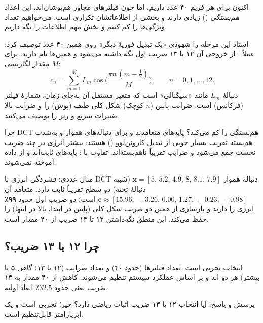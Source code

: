 اکنون برای هر فریم ۴۰ عدد داریم، اما چون فیلترهای مجاور هم‌پوشان‌اند، این اعداد \emph{هم‌بستگی} () زیادی دارند و بخشی از اطلاعاتشان تکراری است. می‌خواهیم تعداد ویژگی‌ها را کم کنیم و بخش مهم اطلاعات را نگه داریم.

استاد این مرحله را شهودی «یک تبدیل فوریهٔ دیگر» روی همین ۴۰ عدد توصیف کرد: عملاً . از خروجی آن ۱۲ یا ۱۳ ضریب اول نگه داشته می‌شود و همین‌ها  نام دارند. برای $M$ مقدار لگاریتمی:
\[
c_n=\sum_{m=1}^{M} L_m\cos\!\Big(\frac{\pi n\,(m-\tfrac12)}{M}\Big),\qquad n=0,1,\ldots,12 .
\]
دنبالهٔ $L_m$ مانند «سیگنالی» است که متغیر مستقل آن به‌جای زمان، شمارهٔ فیلتر (فرکانس) است. ضرایب پایین ($n$ کوچک) شکل کلی طیف (پوش) را و ضرایب بالا تغییرات سریع و ریز را توصیف می‌کنند.

\begin{correctionbox}{چرا DCT هم‌بستگی را کم می‌کند؟}
پایه‌های  متعامدند و برای دنباله‌های هموار و به‌شدت هم‌بسته تقریب بسیار خوبی از تبدیل کارونن‌لوو () هستند: بیشتر انرژی در چند ضریب نخست جمع می‌شود و ضرایب تقریباً ناهم‌بسته‌اند. تفاوت با : پایه‌های  ثابت‌اند و از داده آموخته نمی‌شوند.
\end{correctionbox}

\begin{addedbox}{مثال عددی: فشردگی انرژی با DCT}
دنبالهٔ هموار $\mathbf{x}=[5,\,5.2,\,4.9,\,8,\,8.1,\,7.9]$ (شبیه دنبالهٔ تخته) دو سطح تقریباً ثابت دارد.  متعامد آن $\mathbf{c}\approx[15.96,\,-3.26,\,0.00,\,1.27,\,-0.23,\,-0.98]$ است؛ دو ضریب اول حدود \textbf{۹۹٪} انرژی را دارند و بازسازی از همین دو ضریب شکل کلی (پایین در ابتدا، بالا در انتها) را حفظ می‌کند. این منطق نگه‌داشتن ۱۲ تا ۱۳ ضریب از ۴۰ مقدار است.
\end{addedbox}

\subsection{چرا ۱۲ یا ۱۳ ضریب؟}
انتخاب تجربی است. تعداد فیلترها (حدود ۴۰) و تعداد ضرایب (۱۲ یا ۱۳؛ گاهی ۵ یا بیشتر) هر دو اند و بر اساس عملکرد سیستم تنظیم می‌شوند. کاهش از ۴۰ مقدار به ۱۳ ضریب یعنی حدود $32.5$٪ ابعاد اولیه.

\begin{exambox}{پرسش و پاسخ: آیا انتخاب ۱۲ یا ۱۳ ضریب اثبات ریاضی دارد؟}
خیر؛ تجربی است و یک ابرپارامتر قابل‌تنظیم است.
\end{exambox}

